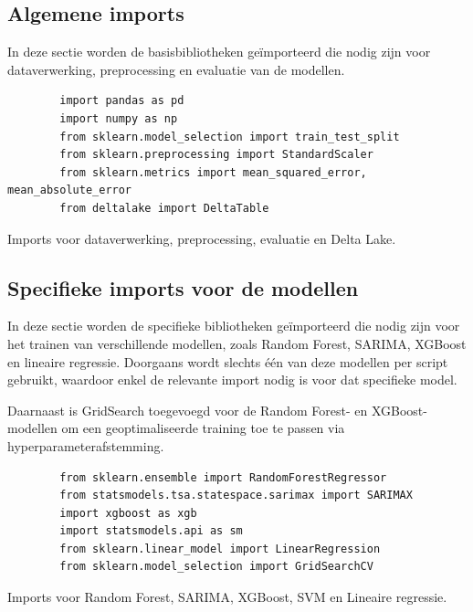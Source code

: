 \vspace{1 em}

\subsection*{Algemene imports}

In deze sectie worden de basisbibliotheken geïmporteerd die nodig zijn voor dataverwerking, preprocessing en evaluatie van de modellen.

\vspace{1em} %

\begin{listing}[H]
    \begin{verbatim}
        import pandas as pd
        import numpy as np
        from sklearn.model_selection import train_test_split
        from sklearn.preprocessing import StandardScaler
        from sklearn.metrics import mean_squared_error, mean_absolute_error
        from deltalake import DeltaTable
    \end{verbatim}
    \caption[Algemene imports]{Imports voor dataverwerking, preprocessing, evaluatie en Delta Lake.}
\end{listing}

\newpage

\subsection*{Specifieke imports voor de modellen}

In deze sectie worden de specifieke bibliotheken geïmporteerd die nodig zijn voor het trainen van verschillende modellen, zoals Random Forest, SARIMA, XGBoost en lineaire regressie. Doorgaans wordt slechts één van deze modellen per script gebruikt, waardoor enkel de relevante import nodig is voor dat specifieke model.

\vspace{1 em}

Daarnaast is GridSearch toegevoegd voor de Random Forest- en XGBoost-modellen om een geoptimaliseerde training toe te passen via hyperparameterafstemming.



\vspace{1em} 

\begin{listing}[H]
    \begin{verbatim}
        from sklearn.ensemble import RandomForestRegressor
        from statsmodels.tsa.statespace.sarimax import SARIMAX
        import xgboost as xgb
        import statsmodels.api as sm
        from sklearn.linear_model import LinearRegression
        from sklearn.model_selection import GridSearchCV
    \end{verbatim}
    \caption[Specifieke imports voor modellen]{Imports voor Random Forest, SARIMA, XGBoost, SVM en Lineaire regressie.}
\end{listing}

